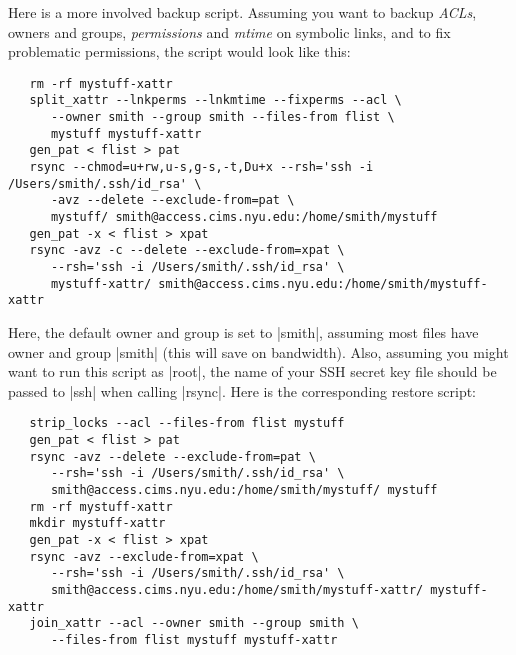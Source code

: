 \documentclass[11pt]{article}
\begin{document}
Here is a more involved backup script.
Assuming you want to backup
\emph{ACLs}, 
owners and groups,
\emph{permissions} and \emph{mtime} on symbolic links,
and
to fix problematic permissions, the script would look like this:
\begin{Verbatim}
   rm -rf mystuff-xattr
   split_xattr --lnkperms --lnkmtime --fixperms --acl \
      --owner smith --group smith --files-from flist \
      mystuff mystuff-xattr
   gen_pat < flist > pat
   rsync --chmod=u+rw,u-s,g-s,-t,Du+x --rsh='ssh -i /Users/smith/.ssh/id_rsa' \
      -avz --delete --exclude-from=pat \
      mystuff/ smith@access.cims.nyu.edu:/home/smith/mystuff
   gen_pat -x < flist > xpat
   rsync -avz -c --delete --exclude-from=xpat \
      --rsh='ssh -i /Users/smith/.ssh/id_rsa' \
      mystuff-xattr/ smith@access.cims.nyu.edu:/home/smith/mystuff-xattr
\end{Verbatim}
Here, the default owner and group is set to |smith|, assuming 
most files have owner and group |smith| (this will save
on bandwidth).
Also, assuming you might want to run this script as |root|,
the name of your SSH secret key file should be passed
to |ssh| when calling |rsync|.
Here is the corresponding restore script:
\begin{Verbatim}
   strip_locks --acl --files-from flist mystuff
   gen_pat < flist > pat
   rsync -avz --delete --exclude-from=pat \
      --rsh='ssh -i /Users/smith/.ssh/id_rsa' \
      smith@access.cims.nyu.edu:/home/smith/mystuff/ mystuff
   rm -rf mystuff-xattr
   mkdir mystuff-xattr
   gen_pat -x < flist > xpat
   rsync -avz --exclude-from=xpat \
      --rsh='ssh -i /Users/smith/.ssh/id_rsa' \
      smith@access.cims.nyu.edu:/home/smith/mystuff-xattr/ mystuff-xattr
   join_xattr --acl --owner smith --group smith \
      --files-from flist mystuff mystuff-xattr
\end{Verbatim}
\end{document}
